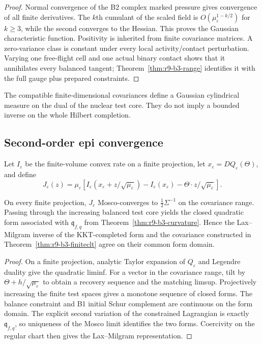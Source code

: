 \begin{proof}
Normal convergence of the B2 complex marked pressure gives convergence of all
finite derivatives.  The $k$th cumulant of the scaled field is
$O(\mu_\varepsilon^{1-k/2})$ for $k\ge3$, while the second converges to the
Hessian.  This proves the Gaussian characteristic function.  Positivity is
inherited from finite covariance matrices.  A zero-variance class is constant
under every local activity/contact perturbation.  Varying one free-flight cell
and one actual binary contact shows that it annihilates every balanced tangent;
Theorem~\ref{thm:r9-b3-range} identifies it with the full gauge plus prepared
constraints.
\end{proof}

The compatible finite-dimensional covariances define a Gaussian cylindrical
measure on the dual of the nuclear test core.  They do not imply a bounded
inverse on the whole Hilbert completion.

\subsection{Second-order epi convergence}

Let $I_\varepsilon$ be the finite-volume convex rate on a finite projection,
let $x_\varepsilon=DQ_\varepsilon(\Theta)$, and define
\[
 J_\varepsilon(z)=
 \mu_\varepsilon\left[
 I_\varepsilon(x_\varepsilon+z/\sqrt{\mu_\varepsilon})
 -I_\varepsilon(x_\varepsilon)
 -\Theta\cdot z/\sqrt{\mu_\varepsilon}
 \right].
\]

\begin{theorem}
\label{thm:r9-b3-mosco}
On every finite projection, $J_\varepsilon$ Mosco-converges to
$\frac12\Sigma^{-1}$ on the covariance range.  Passing through the increasing
balanced test core yields the closed quadratic form associated with
$\mathfrak q_{f,q}$ from Theorem~\ref{thm:r9-b3-curvature}.  Hence the
Lax--Milgram inverse of the KKT-completed form and the covariance constructed
in Theorem~\ref{thm:r9-b3-finiteclt} agree on their common form domain.
\end{theorem}

\begin{proof}
On a finite projection, analytic Taylor expansion of $Q_\varepsilon$ and
Legendre duality give the quadratic liminf.  For a vector in the covariance
range, tilt by $\Theta+h/\sqrt{\mu_\varepsilon}$ to obtain a recovery sequence
and the matching limsup.  Projectively increasing the finite test spaces gives
a monotone sequence of closed forms.  The balance constraint and B1 initial
Schur complement are continuous on the form domain.  The explicit second
variation of the constrained Lagrangian is exactly
$\mathfrak q_{f,q}$, so uniqueness of the Mosco limit identifies the two
forms.  Coercivity on the regular chart then gives the Lax--Milgram
representation.
\end{proof}

